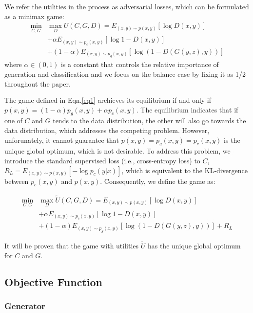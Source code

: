 \documentclass[conference]{IEEEtran}
\begin{document}
We refer the utilities in the process as adversarial losses, which can be formulated as a minimax game:
\begin{equation}
\begin{aligned}
\min_{C, G} & \max_{D} U(C, G, D) = E_{(x, y) \sim p(x, y)}[\log{D(x, y)}] \\
&+ \alpha E_{(x, y) \sim p_c(x, y)}[\log{1 - D(x, y)}] \\
&+ (1-\alpha) E_{(x,y) \sim p_g(x,y)}[\log(1 - D(G(y,z), y))]
\end{aligned}
\label{eq1}
\end{equation}
where $\alpha \in (0,1)$ is a constant that controls the relative importance of generation and classification and we focus on the balance case by fixing it as 1/2 throughout the paper. 

The game defined in Eqn.\ref{eq1} archieves its equilibrium if and only if $p(x, y) = (1 - \alpha) p_g(x, y) + \alpha p_c(x, y)$. The equilibrium indicates that if one of $C$ and $G$ tends to the data distribution, the other will also go towards the data distribution, which addresses the competing problem. However, unforunately, it cannot guarantee that $p(x, y) = p_g(x, y) = p_c(x, y)$ is the unique global optimum, which is not desirable. To address this problem, we introduce the standard supervised loss (i.e., cross-entropy loss) to $C$, $R_L = E_{(x,y) \sim p(x,y)}[-\log p_c(y|x)]$, which is equivalent to the KL-divergence between $p_c(x, y)$ and $p(x, y)$. Consequently, we define the game as:

\begin{equation}
\begin{aligned}
\min_{C, G} & \max_{D} \tilde{U}(C, G, D) = E_{(x, y) \sim p(x, y)}[\log{D(x, y)}] \\
&+ \alpha E_{(x, y) \sim p_c(x, y)}[\log{1 - D(x, y)}] \\
&+ (1-\alpha) E_{(x,y) \sim p_g(x,y)}[\log(1 - D(G(y,z), y))] + R_L
\end{aligned}
\label{eq2}
\end{equation}

It will be proven that the game with utilities $\tilde{U}$ has the unique global optimum for $C$ and $G$. 

\subsection{Objective Function}

\subsubsection{Generator}
\end{document}
